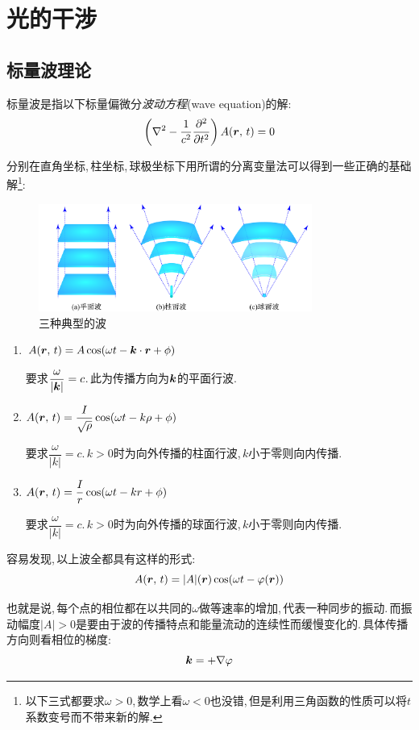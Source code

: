 \setcounter{chapter}{7}
\chapter{光的干涉}


\section{标量波理论}
标量波是指以下标量偏微分\emph{波动方程}(wave equation)的解:
\[\left(\nabla^2 -\frac{1}{c^2}\frac{\partial^2}{\partial t^2}\right)A(\boldsymbol{r},\,t)=0\]

分别在直角坐标,\,柱坐标,\,球极坐标下用所谓的分离变量法可以得到一些正确的基础解\footnote{以下三式都要求$\omega >0$,\,数学上看$\omega<0$也没错,\,但是利用三角函数的性质可以将$t$系数变号而不带来新的解.}:
\begin{figure}[H]
\centering
\includegraphics[width=0.8\textwidth]{image/14-1-1.png}
\caption{三种典型的波}
\end{figure}

\begin{enumerate}
	\item $A(\boldsymbol{r},\,t)=A\cos(\omega t-\boldsymbol{k}\cdot \boldsymbol{r}+\phi)$

	要求$\dfrac{\omega}{|\boldsymbol{k}|}=c$.\,此为传播方向为$\boldsymbol{k}$的平面行波.
	\item $A(\boldsymbol{r},\,t)=\dfrac{I}{\sqrt{\rho}}\cos(\omega t-k\rho+\phi)$

	要求$\dfrac{\omega}{|k|}=c$.\,$k>0$时为向外传播的柱面行波,\,$k$小于零则向内传播.
	\item $A(\boldsymbol{r},\,t)=\dfrac{I}{r}\cos(\omega t-kr+\phi)$

	要求$\dfrac{\omega}{|k|}=c$.\,$k>0$时为向外传播的球面行波,\,$k$小于零则向内传播.
\end{enumerate}

容易发现,\,以上波全都具有这样的形式:
\[A(\boldsymbol{r},\,t)=|A|(\boldsymbol{r})\cos(\omega t-\varphi(\boldsymbol{r}))\]

也就是说,\,每个点的相位都在以共同的$\omega$做等速率的增加,\,代表一种同步的振动.\,而振动幅度$|A|>0$是要由于波的传播特点和能量流动的连续性而缓慢变化的.\,具体传播方向则看相位的梯度:
\[\boldsymbol{k}=+\nabla \varphi\]

